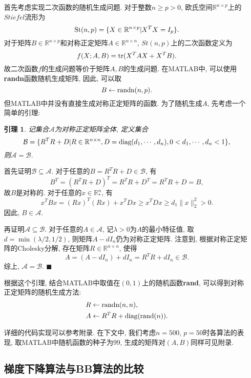 \documentclass[UTF8]{ctexart}
\newtheorem{lemma}[theorem]{引理}
\newenvironment{proof}{{\textit{证明}:\quad }}{\hfill $\blacksquare$\par}
\begin{document}
首先考虑实现二次函数的随机生成问题. 对于整数$n\geq p>0$, 欧氏空间$\mathbb{R}^{n\times p}$上的$Stiefel$流形为
\[\textup{St}(n,p)=\{X\in\mathbb{R}^{n\times p}|X^T X=I_p\}.\]
对于矩阵$B\in \mathbb{R}^{n\times p}$和对称正定矩阵$A\in\mathbb{R}^{n\times n}$, $St(n,p)$上的二次函数定义为
\[f(X;A,B)=\textup{tr}(X^T AX+X^T B).\]
故二次函数$f$的生成问题等价于矩阵$A,B$的生成问题. 在MATLAB中, 可以使用\textbf{randn}函数随机生成矩阵, 因此, 可以取
\[B\leftarrow \textup{randn}(n,p).\]
但MATLAB中并没有直接生成对称正定矩阵的函数. 为了随机生成$A$, 先考虑一个简单的引理: 
\begin{lemma}
    记集合$\mathcal{A}$为对称正定矩阵全体, 定义集合
    \[\mathcal{B}=\{R^T R+D|R\in\mathbb{R}^{n\times n}, D=\textup{diag}(d_1,\cdots,d_n), 0<d_1,\cdots,d_n<1\},\]
    则$\mathcal{A}=\mathcal{B}$. 
\end{lemma}
\begin{proof}
    首先证明$\mathcal{B}\subseteq\mathcal{A}$. 对于任意的$B=R^T R+D\in\mathcal{B}$, 有
    \[B^T=(R^T R+D)^T=R^T R+D^T=R^T R+D=B,\]
    故$B$是对称的. 对于任意的$x\in\mathbb{R}^n_*$, 有
    \[x^T Bx=(Rx)^T(Rx)+x^T Dx\geq x^T Dx\geq d_1 \lVert x\rVert_2^2>0.\]
    因此, $B\in\mathcal{A}$.\par
    再证明$\mathcal{A}\subseteq\mathcal{B}$. 对于任意的$A\in\mathcal{A}$, 记$\lambda>0$为$A$的最小特征值, 取$d=\min(\lambda/2,1/2)$, 则矩阵$A-dI_n$仍为对称正定矩阵. 注意到, 根据对称正定矩阵的Cholesky分解, 存在矩阵$R\in\mathbb{R}^{n\times n}$, 使得
    \[A=(A-dI_n)+dI_n=R^T R+dI_n\in\mathcal{B}.\]
    综上, $\mathcal{A}=\mathcal{B}$. 
\end{proof}\par
根据这个引理, 结合MATLAB中取值在$(0,1)$上的随机函数\textbf{rand}, 可以得到对称正定矩阵的随机生成方法:
\begin{align*}
    R&\leftarrow \textup{randn}(n,n),\\
    A&\leftarrow R^T R+\textup{diag}(\textup{rand}(n)). 
\end{align*}\par
详细的代码实现可以参考附录. 在下文中, 我们考虑$n=500$, $p=50$时各算法的表现, 取MATLAB中随机函数的种子为$99$, 生成的矩阵对$(A,B)$同样可见附录.

\subsection{梯度下降算法与BB算法的比较}
\end{document}
